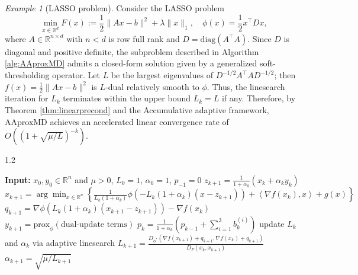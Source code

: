 \documentclass{article}
\newcommand{\dual}[1]{\left\langle {#1} \right\rangle}
\theoremstyle{plain}
\theoremstyle{definition}
\theoremstyle{remark}
\newtheorem{example}[theorem]{Example}
\begin{document}
\begin{example}[LASSO problem]\label{ex: Lasso}
Consider the LASSO problem
\begin{equation}%
    \min_{x \in \mathbb{R}^d} F(x) := \frac{1}{2} \|Ax - b\|^2 + \lambda \|x\|_1, \quad \phi(x)=\frac{1}{2} x^\top D x,
\end{equation}
where $A \in \mathbb{R}^{n \times d}$ with $n<d$ is row full rank and $D=\mathrm{diag}(A^\top A)$. Since $D$ is diagonal and positive definite, the subproblem described in Algorithm \ref{alg:AAproxMD} admits a closed-form solution given by a generalized soft-thresholding operator. Let $L$ be the largest eigenvalues of $D^{-1/2}A^\top AD^{-1/2}$; then $f(x)=\frac{1}{2}\|Ax-b\|^2$ is %
$L$-dual relatively smooth to $\phi$. Thus, the linesearch iteration for $L_k$ terminates within the upper bound $L_k=L$ if any. Therefore, by Theorem \ref{thm:linearprecond} and the Accumulative adaptive framework, AAproxMD achieves an accelerated linear convergence rate of $O\left((1+\sqrt{\mu/L})^{-k}\right)$.

\begin{algorithm}[t]
\caption{AAproxMD}
\label{alg:AAproxMD}
\begin{spacing}{1.2} %
\begin{algorithmic}[1]
\STATE \textbf{Input:} $x_0, y_0 \in \mathbb{R}^n$ and $\mu>0$, $L_0=1$, $\alpha_0=1$, $p_{-1}=0$
  \REPEAT
    \STATE $z_{k+1} = \frac{1}{1+\alpha_k}(x_k + \alpha_k y_k)$
    \STATE $x_{k+1} = \arg\min_{x\in\mathbb{R}^n} \left \{\frac{1}{L_k(1+\alpha_k)}\phi\left(-L_k(1+\alpha_k)\left(x-z_{k+1}\right)\right)+\dual{\nabla f(x_{k}),x}+g(x)\right \}$
    \STATE $q_{k+1} = \nabla \phi(L_k(1+\alpha_k)(x_{k+1}-z_{k+1})) - \nabla f(x_k)$
    \STATE $y_{k+1} = \text{prox}_{\phi}\left( \text{dual-update terms} \right)$ 
    \STATE $p_{k} = \frac{1}{1+\alpha_k}(p_{k-1} + \sum_{i=1}^3 b_k^{(i)})$
      \STATE update $L_k$ and $\alpha_k$ via adaptive linesearch%
    \ENDIF
  \STATE $L_{k+1} = \frac{D_{\phi^*}(\nabla f(x_{k+1}) + q_{k+1}, \nabla f(x_k) + q_{k+1})}{D_F(x_k, x_{k+1})}$
  \STATE $\alpha_{k+1} = \sqrt{\mu/L_{k+1}}$
\ENDFOR
\end{algorithmic}
\end{spacing}
\end{algorithm}



\end{example}
\end{document}
